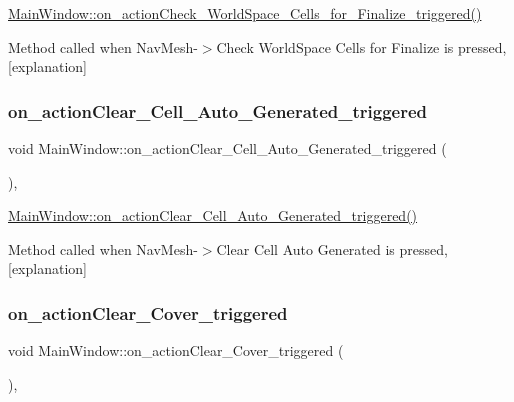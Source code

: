 \hyperlink{class_main_window_aa95e768258ffcd2b4d8f2460e620f9db}{Main\+Window\+::on\+\_\+action\+Check\+\_\+\+World\+Space\+\_\+\+Cells\+\_\+for\+\_\+\+Finalize\+\_\+triggered()} 

Method called when Nav\+Mesh-\/$>$Check World\+Space Cells for Finalize is pressed, \mbox{[}explanation\mbox{]} \mbox{\label{class_main_window_a563c87486ad750b682d6e1f200484d68}} 
\subsubsection{\texorpdfstring{on\+\_\+action\+Clear\+\_\+\+Cell\+\_\+\+Auto\+\_\+\+Generated\+\_\+triggered}{on\_actionClear\_Cell\_Auto\_Generated\_triggered}}
{\footnotesize\ttfamily void Main\+Window\+::on\+\_\+action\+Clear\+\_\+\+Cell\+\_\+\+Auto\+\_\+\+Generated\+\_\+triggered (\begin{DoxyParamCaption}{ }\end{DoxyParamCaption})\hspace{0.3cm}{\ttfamily [private]}, {\ttfamily [slot]}}



\hyperlink{class_main_window_a563c87486ad750b682d6e1f200484d68}{Main\+Window\+::on\+\_\+action\+Clear\+\_\+\+Cell\+\_\+\+Auto\+\_\+\+Generated\+\_\+triggered()} 

Method called when Nav\+Mesh-\/$>$Clear Cell Auto Generated is pressed, \mbox{[}explanation\mbox{]} \mbox{\label{class_main_window_aa76285613d70d8f605af173f444232aa}} 
\subsubsection{\texorpdfstring{on\+\_\+action\+Clear\+\_\+\+Cover\+\_\+triggered}{on\_actionClear\_Cover\_triggered}}
{\footnotesize\ttfamily void Main\+Window\+::on\+\_\+action\+Clear\+\_\+\+Cover\+\_\+triggered (\begin{DoxyParamCaption}{ }\end{DoxyParamCaption})\hspace{0.3cm}{\ttfamily [private]}, {\ttfamily [slot]}}



